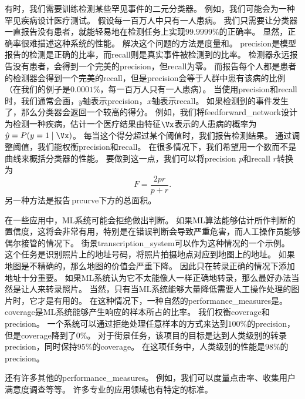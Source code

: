有时，我们需要训练检测某些罕见事件的二元分类器。
例如，我们可能会为一种罕见疾病设计医疗测试。
假设每一百万人中只有一人患病。
我们只需要让分类器一直报告没有患者，就能轻易地在检测任务上实现$99.9999\%$的正确率。
显然，正确率很难描述这种系统的性能。
解决这个问题的方法是度量和。
\gls{precision}是模型报告的检测是正确的比率，而\gls{recall}则是真实事件被检测到的比率。
检测器永远报告没有患者，会得到一个完美的\gls{precision}，但\gls{recall}为零。
而报告每个人都是患者的检测器会得到一个完美的\gls{recall}，但是\gls{precision}会等于人群中患有该病的比例（在我们的例子是$0.0001\%$，每一百万人只有一人患病）。
当使用\gls{precision}和\gls{recall}时，我们通常会画，$y$轴表示\gls{precision}，$x$轴表示\gls{recall}。
如果检测到的事件发生了，那么分类器会返回一个较高的得分。
例如，我们将\gls{feedforward_network}设计为检测一种疾病，估计一个医疗结果由特征$\Vx$表示的人患病的概率为$\hat{y} = P(y=1\mid\Vx)$。
每当这个得分超过某个阈值时，我们报告检测结果。
通过调整阈值，我们能权衡\gls{precision}和\gls{recall}。
在很多情况下，我们希望用一个数而不是曲线来概括分类器的性能。
要做到这一点，我们可以将\gls{precision} $p$和\gls{recall} $r$转换为
\begin{equation}
	F = \frac{2pr}{p+r}.
\end{equation}
另一种方法是报告\,\gls{prcurve}下方的总面积。


在一些应用中，\gls{ML}系统可能会拒绝做出判断。
如果\gls{ML}算法能够估计所作判断的置信度，这将会非常有用，特别是在错误判断会导致严重危害，而人工操作员能够偶尔接管的情况下。
街景\gls{transcription_system}可以作为这种情况的一个示例。
这个任务是识别照片上的地址号码，将照片拍摄地点对应到地图上的地址。%
如果地图是不精确的，那么地图的价值会严重下降。
因此只在转录正确的情况下添加地址十分重要。
如果\gls{ML}系统认为它不太能像人一样正确地转录，那么最好办法当然是让人来转录照片。
当然，只有当\gls{ML}系统能够大量降低需要人工操作处理的图片时，它才是有用的。
在这种情况下，一种自然的\gls{performance_measures}是。
\gls{coverage}是\gls{ML}系统能够产生响应的样本所占的比率。
我们权衡\gls{coverage}和\gls{precision}。
一个系统可以通过拒绝处理任意样本的方式来达到$100\%$的\gls{precision}，但是\gls{coverage}降到了$0\%$。
对于街景任务，该项目的目标是达到人类级别的转录\gls{precision}，同时保持$95\%$的\gls{coverage}。
在这项任务中，人类级别的性能是$98\%$的\gls{precision}。

还有许多其他的\gls{performance_measures}。
例如，我们可以度量点击率、收集用户满意度调查等等。
许多专业的应用领域也有特定的标准。

